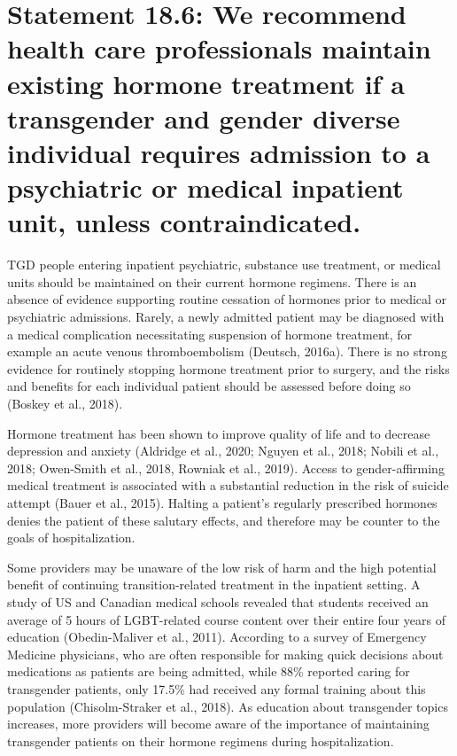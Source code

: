 \documentclass[
]{book}
\begin{document}
\hypertarget{statement-18.6-we-recommend-health-care-professionals-maintain-existing-hormone-treatment-if-a-transgender-and-gender-diverse-individual-requires-admission-to-a-psychiatric-or-medical-inpatient-unit-unless-contraindicated.}{%
\section*{Statement 18.6: We recommend health care professionals maintain existing hormone treatment if a transgender and gender diverse individual requires admission to a psychiatric or medical inpatient unit, unless contraindicated.}\label{statement-18.6-we-recommend-health-care-professionals-maintain-existing-hormone-treatment-if-a-transgender-and-gender-diverse-individual-requires-admission-to-a-psychiatric-or-medical-inpatient-unit-unless-contraindicated.}}

TGD people entering inpatient psychiatric, substance use treatment, or medical units should be
maintained on their current hormone regimens.
There is an absence of evidence supporting routine cessation of hormones prior to medical or
psychiatric admissions. Rarely, a newly admitted
patient may be diagnosed with a medical complication necessitating suspension of hormone
treatment, for example an acute venous thromboembolism (Deutsch, 2016a). There is no strong
evidence for routinely stopping hormone treatment prior to surgery, and the risks and benefits
for each individual patient should be assessed
before doing so (Boskey et al., 2018).

Hormone treatment has been shown to improve
quality of life and to decrease depression and
anxiety (Aldridge et al., 2020; Nguyen et al., 2018;
Nobili et al., 2018; Owen-Smith et al., 2018,
Rowniak et al., 2019). Access to gender-affirming
medical treatment is associated with a substantial
reduction in the risk of suicide attempt (Bauer
et al., 2015). Halting a patient's regularly prescribed hormones denies the patient of these
salutary effects, and therefore may be counter to
the goals of hospitalization.

Some providers may be unaware of the low risk
of harm and the high potential benefit of continuing transition-related treatment in the inpatient
setting. A study of US and Canadian medical
schools revealed that students received an average
of 5 hours of LGBT-related course content over
their entire four years of education (Obedin-Maliver
et al., 2011). According to a survey of Emergency
Medicine physicians, who are often responsible for
making quick decisions about medications as
patients are being admitted, while 88\% reported
caring for transgender patients, only 17.5\% had
received any formal training about this population
(Chisolm-Straker et al., 2018). As education about
transgender topics increases, more providers will
become aware of the importance of maintaining
transgender patients on their hormone regimens
during hospitalization.
\end{document}
